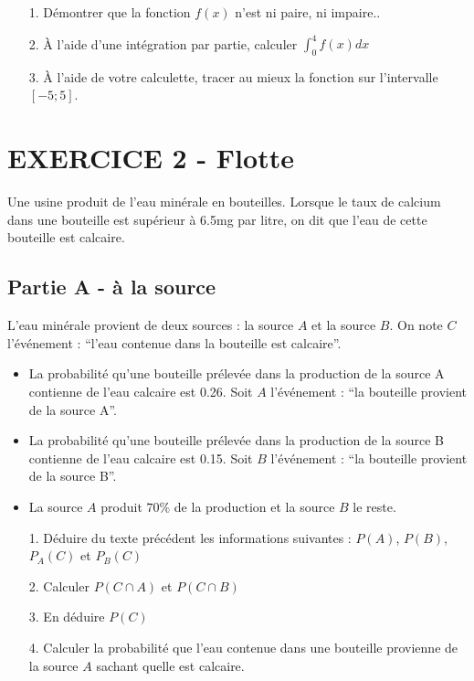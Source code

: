\documentclass[12pt]{article}
\begin{document}
\begin{enumerate}
\item[1.] Démontrer que la fonction $f(x)$ n'est ni paire, ni impaire..
\item[2.] À l'aide d'une intégration par partie, calculer $\int_{0}^{4} f(x) dx$
\item[3.] À l'aide de votre calculette, tracer au mieux la fonction sur l'intervalle $[-5 ; 5]$.
\end{enumerate}

\begin{figure}[H]
  \centering
\end{figure}

\newpage
\section*{EXERCICE 2 - Flotte} %
Une usine produit de l'eau minérale en bouteilles. Lorsque le taux de calcium  dans une bouteille est supérieur à 6.5mg par litre, on dit que l'eau de cette bouteille est calcaire.

\subsection*{Partie A - à la source}

L'eau minérale provient de deux sources : la source $A$ et la source $B$. On note $C$ l'événement : ``l'eau contenue dans la bouteille est calcaire''.

\begin{itemize}
\item La probabilité qu'une bouteille prélevée dans la production de la source A contienne de l'eau calcaire est 0.26. Soit $A$ l'événement : ``la bouteille provient de la source A''.
\item La probabilité qu'une bouteille prélevée dans la production de la source B contienne de l'eau calcaire est 0.15. Soit $B$ l'événement : ``la bouteille provient de la source B''.
\item La source $A$ produit $70\%$ de la production et la source $B$ le reste.
\end{itemize}

\begin{enumerate}
\item[1.]  Déduire du texte précédent les informations suivantes : $P(A)$, $P(B)$,  $P_A(C)$ et  $P_B(C)$
\item[2.] Calculer $P(C \cap A)$ et $P(C \cap B)$
\item[3.] En déduire $P(C)$
\item[4.] Calculer la probabilité que l'eau contenue dans une bouteille provienne de la source $A$ sachant quelle est calcaire.
\end{enumerate}
\end{document}
